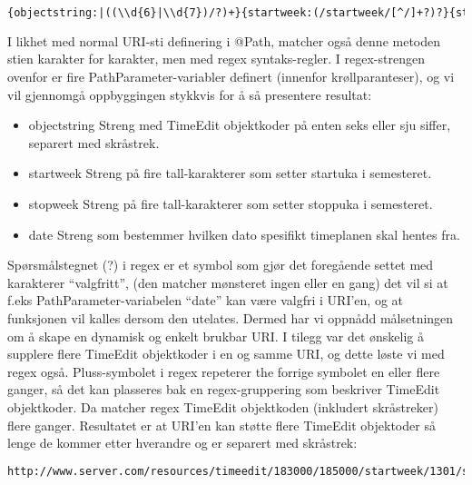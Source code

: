 \documentclass[../main.tex]{subfiles}
\begin{document}
\begin{lstlisting}[language=HTML, frame=single, caption={asdasdsadasdasdasdsadsadasdasdsadsa}]
{objectstring:|((\\d{6}|\\d{7})/?)+}{startweek:(/startweek/[^/]+?)?}{stopweek:(/stopweek/[^/]+?)?}{date:(/date/[^/]+?)?}
\end{lstlisting}

I likhet med normal URI-sti definering i @Path, matcher også denne metoden stien karakter for karakter, men med regex syntaks-regler. I regex-strengen ovenfor er fire PathParameter-variabler definert (innenfor krøllparanteser), og vi vil gjennomgå oppbyggingen stykkvis for å så presentere resultat:

\begin{itemize}
\item objectstring \newline Streng med TimeEdit objektkoder på enten seks eller sju siffer, separert med skråstrek.
\item startweek \newline Streng på fire tall-karakterer som setter startuka i semesteret.
\item stopweek \newline Streng på fire tall-karakterer som setter stoppuka i semesteret.
\item date \newline Streng som bestemmer hvilken dato spesifikt timeplanen skal hentes fra.
\end{itemize}

Spørsmålstegnet (?) i regex er et symbol som gjør det foregående settet med karakterer “valgfritt”, (den matcher mønsteret ingen eller en gang) det vil si at f.eks PathParameter-variabelen “date” kan være valgfri i URI’en, og at funksjonen vil kalles dersom den utelates. Dermed har vi oppnådd målsetningen om å skape en dynamisk og enkelt brukbar URI.
\newline
I tilegg var det ønskelig å supplere flere TimeEdit objektkoder i en og samme URI, og dette løste vi med regex også. Pluss-symbolet i regex repeterer the forrige symbolet en eller flere ganger, så det kan plasseres bak en regex-gruppering som beskriver TimeEdit objektkoder. Da matcher regex TimeEdit objektkoden (inkludert skråstreker) flere ganger. Resultatet er at URI’en kan støtte flere TimeEdit objektoder så lenge de kommer etter hverandre og er separert med skråstrek:

\begin{lstlisting}[language=HTML, frame=single, caption={asdasdsadasdasdasdsadsadasdasdsadsa}]
http://www.server.com/resources/timeedit/183000/185000/startweek/1301/stopweek/1315
\end{lstlisting}
\end{document}
